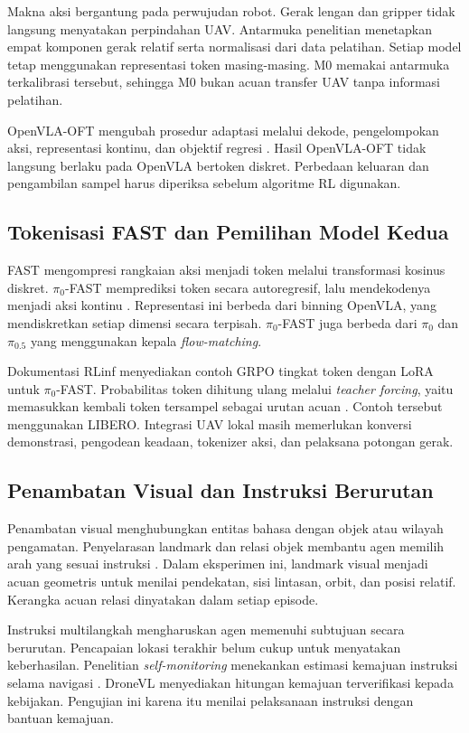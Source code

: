 Makna aksi bergantung pada perwujudan robot. Gerak lengan dan gripper tidak langsung menyatakan perpindahan UAV. Antarmuka penelitian menetapkan empat komponen gerak relatif serta normalisasi dari data pelatihan. Setiap model tetap menggunakan representasi token masing-masing. M0 memakai antarmuka terkalibrasi tersebut, sehingga M0 bukan acuan transfer UAV tanpa informasi pelatihan.

OpenVLA-OFT mengubah prosedur adaptasi melalui dekode, pengelompokan aksi, representasi kontinu, dan objektif regresi \citep{kim2025oft}. Hasil OpenVLA-OFT tidak langsung berlaku pada OpenVLA bertoken diskret. Perbedaan keluaran dan pengambilan sampel harus diperiksa sebelum algoritme RL digunakan.

\subsection{Tokenisasi FAST dan Pemilihan Model Kedua}
\label{subsec:pi0fast}
FAST mengompresi rangkaian aksi menjadi token melalui transformasi kosinus diskret. $\pi_0$-FAST memprediksi token secara autoregresif, lalu mendekodenya menjadi aksi kontinu \citep{pertsch2025fast}. Representasi ini berbeda dari binning OpenVLA, yang mendiskretkan setiap dimensi secara terpisah. $\pi_0$-FAST juga berbeda dari $\pi_0$ dan $\pi_{0.5}$ yang menggunakan kepala \textit{flow-matching}.

Dokumentasi RLinf menyediakan contoh GRPO tingkat token dengan LoRA untuk $\pi_0$-FAST. Probabilitas token dihitung ulang melalui \textit{teacher forcing}, yaitu memasukkan kembali token tersampel sebagai urutan acuan \citep{rlinf2026pi0fast}. Contoh tersebut menggunakan LIBERO. Integrasi UAV lokal masih memerlukan konversi demonstrasi, pengodean keadaan, tokenizer aksi, dan pelaksana potongan gerak.

\subsection{Penambatan Visual dan Instruksi Berurutan}
\label{subsec:grounding_spasial}
Penambatan visual menghubungkan entitas bahasa dengan objek atau wilayah pengamatan. Penyelarasan landmark dan relasi objek membantu agen memilih arah yang sesuai instruksi \citep{zhang2022explicit}. Dalam eksperimen ini, landmark visual menjadi acuan geometris untuk menilai pendekatan, sisi lintasan, orbit, dan posisi relatif. Kerangka acuan relasi dinyatakan dalam setiap episode. %

Instruksi multilangkah mengharuskan agen memenuhi subtujuan secara berurutan. Pencapaian lokasi terakhir belum cukup untuk menyatakan keberhasilan. Penelitian \textit{self-monitoring} menekankan estimasi kemajuan instruksi selama navigasi \citep{ma2019selfmonitoring}. DroneVL menyediakan hitungan kemajuan terverifikasi kepada kebijakan. Pengujian ini karena itu menilai pelaksanaan instruksi dengan bantuan kemajuan. %

